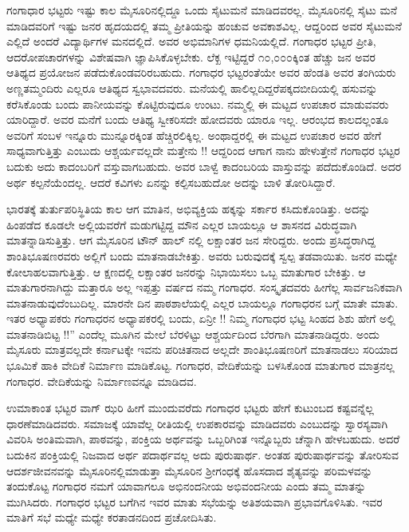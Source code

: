 {ಗಂಗಾಧಾರ ಭಟ್ಟರು ಇಷ್ಟು ಕಾಲ ಮೈಸೂರಿನಲ್ಲಿದ್ದೂ ಒಂದು ಸೈಟು\enginline{-}ಮನೆ ಮಾಡಿದವರಲ್ಲ. ಮೈಸೂರಿನಲ್ಲಿ ಸೈಟು ಮನೆ ಮಾಡಿದವರಿಗೆ ಇಷ್ಟು ಜನರ ಹೃದಯದಲ್ಲಿ ತಮ್ಮ ಪ್ರೀತಿಯನ್ನು ಹಂಚುವ ಅವಕಾಶವಿಲ್ಲ. ಆದ್ದರಿಂದ ಅವರ ಸೈಟು\enginline{-}ಮನೆ ಎಲ್ಲಿದೆ ಅಂದರೆ ವಿದ್ಯಾರ್ಥಿಗಳ ಮನದಲ್ಲಿದೆ. ಅವರ ಅಭಿಮಾನಿಗಳ ಧಮನಿಯಲ್ಲಿದೆ. ಗಂಗಾಧರ ಭಟ್ಟರ ಪ್ರೀತಿ, ಆದರೋಪಚಾರಗಳನ್ನು ವಿಶೇಷವಾಗಿ ಜ್ಞಾಪಿಸಿಕೊಳ್ಳಬೇಕು. ಲೆಕ್ಖ ಇಟ್ಟಿದ್ದರೆ ೧೦,೦೦೦ಕ್ಕಿಂತ ಹೆಚ್ಚು ಜನ ಅವರ ಆತಿಥ್ಯದ ಪ್ರಯೋಜನ ಪಡೆದುಕೊಂಡವರಿರಬಹುದು. ಗಂಗಾಧರ ಭಟ್ಟರಂತೆಯೇ ಅವರ ಹೆಂಡತಿ ಅವರ ತಂಗಿಯರು ಅಣ್ಣ\enginline{-}ತಮ್ಮಂದಿರು ಎಲ್ಲರೂ ಆತಿಥ್ಯದ ಸ್ವಭಾವದವರು. ಮನೆಯಲ್ಲಿ ಹಾಲಿಲ್ಲದಿದ್ದರೆ\break ಪಕ್ಕದಬೀದಿಯಲ್ಲಿ ಹಸುವನ್ನು ಕರೆಸಿಕೊಂಡು ಬಂದು ಪಾನೀಯವನ್ನು ಕೊಟ್ಟಿರು\-ವುದೂ ಉಂಟು. ನಮ್ಮಲ್ಲಿ ಈ ಮಟ್ಟದ ಉಪಚಾರ ಮಾಡುವವರು ಯಾರಿದ್ದಾರೆ. ಅವರ ಮನೆಗೆ ಬಂದು ಆತಿಥ್ಯ ಸ್ವೀಕರಿಸದೇ ಹೋದವರು ಯಾರೂ ಇಲ್ಲ. ಆರಂಭದ ಕಾಲದಲ್ಲಂತೂ ಅವರಿಗೆ ಸಂಬಳ ಇನ್ನೂರು ಮುನ್ನೂರಕ್ಕಿಂತ ಹೆಚ್ಚಿರಲಿಕ್ಕಿಲ್ಲ. ಅಂಥಾದ್ದರಲ್ಲಿ ಈ ಮಟ್ಟದ ಉಪಚಾರ ಅವರ ಹೇಗೆ ಸಾಧ್ಯವಾಗುತ್ತಿತ್ತು ಎಂಬುದು ಆಶ್ಚರ್ಯವಲ್ಲದೇ ಮತ್ತೇನು !! ಆದ್ದರಿಂದ ಆಗಾಗ ನಾನು ಹೇಳುತ್ತೇನೆ ಗಂಗಾಧರ ಭಟ್ಟರ ಬದುಕು ಅದು \hbox{ಕಾದಂಬರಿಗೆ} ವಸ್ತುವಾಗಬಹುದು. ಅವರ ಬಾಳ್ವೆ ಕಾದಂಬರಿಯ ವಾಸ್ತುವನ್ನು ಪದೆದುಕೊಂಡಿದೆ. ಅದರ ಅರ್ಥ ಕಲ್ಪನೆಯೆಂದಲ್ಲ. ಆದರೆ ಕವಿಗಳು ಏನನ್ನು ಕಲ್ಪಿಸಬಹುದೋ ಅದನ್ನು ಬಾಳಿ ತೋರಿಸಿದ್ದಾರೆ.

ಭಾರತಕ್ಕೆ ತುರ್ತುಪರಿಸ್ಥಿತಿಯ ಕಾಲ \enginline{-} ಆಗ ಮಾತಿನ, ಅಭಿವ್ಯಕ್ತಿಯ ಹಕ್ಕನ್ನು ಸರ್ಕಾರ ಕಸಿದುಕೊಂಡಿತ್ತು.  ಅದನ್ನು ಹಿಂಪಡೆದ ಕೂಡಲೇ ಅಲ್ಲಿಯವರೆಗೆ ಮಡುಗಟ್ಟಿದ್ದ ಮೌನ ಎಲ್ಲರ ಬಾಯಲ್ಲೂ ಆ ಶಾಸನದ ವಿರುದ್ಧವಾಗಿ ಮಾತನ್ನಾಡಿಸುತ್ತಿತ್ತು. ಆಗ ಮೈಸೂರಿನ ಟೌನ್ ಹಾಲ್ ನಲ್ಲಿ ಲಕ್ಷಾಂತರ ಜನ ಸೇರಿದ್ದರು. ಅಂದು ಪ್ರಸಿದ್ಧರಾಗಿದ್ದ ಶಾಂತಿ\break ಭೂಷಣರವರು ಅಲ್ಲಿಗೆ ಬಂದು ಮಾತನಾಡಬೇಕಿತ್ತು. ಅವರು ಬರುವುದಕ್ಕೆ ಸ್ವಲ್ಪ ತಡವಾಯಿತು. ಜನರ ಮಧ್ಯೇ ಕೋಲಾಹಲವಾಗುತ್ತಿತ್ತು. ಆ ಕ್ಷಣದಲ್ಲಿ ಲಕ್ಷಾಂತರ ಜನರನ್ನು ನಿಭಾಯಿಸಲು ಒಬ್ಬ ಮಾತುಗಾರ ಬೇಕಿತ್ತು. ಆ ಮಾತುಗಾರನಾಗಿದ್ದು ಮತ್ತಾರೂ ಅಲ್ಲ ಇಪ್ಪತ್ತು ವರ್ಷದ ನಮ್ಮ ಗಂಗಾಧರ. ಸಂಸ್ಕೃತದವರು ಹೀಗೆಲ್ಲ ಸಾರ್ವಜನಿಕ\-ವಾಗಿ ಮಾತನಾಡುವು\-ದೆಂಬುದಿಲ್ಲ. ಮಾರನೇ ದಿನ ಪಾಠಶಾಲೆಯಲ್ಲಿ ಎಲ್ಲರ ಬಾಯಲ್ಲೂ ಗಂಗಾಧರನ ಬಗ್ಗೆ ಮಾತೇ ಮಾತು. ಇತರ ಅಧ್ಯಾಪಕರು ಗಂಗಾಧರನ ಅಧ್ಯಾಪಕರಲ್ಲಿ ಬಂದು, ಏನ್ರೀ !! ನಿಮ್ಮ ಗಂಗಾಧರ ಭಟ್ಟ \enginline{-} ಸಿಂಹದ ಶಿಶು \enginline{-} ಹೇಗೆ ಅಲ್ಲಿ ಮಾತನಾಡಿ\-ಬಿಟ್ಟ !!” ಎಂದೆಲ್ಲ ಮೂಗಿನ ಮೇಲೆ ಬೆರಳಿಟ್ಟು ಆಶ್ಚರ್ಯದಿಂದ ಬೆರಗಾಗಿ ಮಾತನಾಡಿದ್ದರು. ಅಂದು ಮೈಸೂರು ಮಾತ್ರವಲ್ಲದೇ ಕರ್ನಾಟಕ್ಕೇ ಇವನು ಪರಿಚಿತನಾದ ಅಲ್ಲದೇ ಶಾಂತಿಭೂಷಣರಿಗೆ  ಮಾತನಾಡಲು ಸರಿಯಾದ ಭೂಮಿಕೆ ಹಾಕಿ ವೇದಿಕೆ ನಿರ್ಮಾಣ ಮಾಡಿಕೊಟ್ಟ. ಗಂಗಾಧರ, ವೇದಿಕೆಯನ್ನು ಬಳಸಿಕೊಂಡ ಮಾತುಗಾರ ಮಾತ್ರನಲ್ಲ ಗಂಗಾಧರ. ವೇದಿಕೆಯನ್ನು ನಿರ್ಮಾಣವನ್ನೂ ಮಾಡಿದವ. 

ಉಮಾಕಾಂತ ಭಟ್ಟರ ವಾಗ್ ಝರಿ  ಹೀಗೆ ಮುಂದುವರೆದು ಗಂಗಾಧರ ಭಟ್ಟರು ಹೇಗೆ ಕುಟುಂಬದ ಕಷ್ಟವನ್ನೆಲ್ಲ ಧಾರಣೆಮಾಡಿದವರು. ಸಮಾಜಕ್ಕೆ ಯಾವೆಲ್ಲ ರೀತಿಯಲ್ಲಿ ಉಪಕಾರವನ್ನು ಮಾಡಿದವರು ಎಂಬುದನ್ನು ಸ್ವಾರಸ್ಯವಾಗಿ ವಿವರಿಸಿ ಅಂತಿಮವಾಗಿ, \enginline{-} ಪಾಠವನ್ನು, ಪಂಕ್ತಿಯ ಅರ್ಥವನ್ನು ಒಬ್ಬರಿಗಿಂತ ಇನ್ನೊಬ್ಬರು  ಚೆನ್ನಾಗಿ ಹೇಳಬಹುದು. ಅದರೆ ಬದುಕಿನ ಪಂಕ್ತಿಯಲ್ಲಿ ನಿಜವಾದ ಅರ್ಥ ಪದಾರ್ಥವಲ್ಲ ಅದು ಪುರುಷಾರ್ಥ. ಅಂತಹ ಪುರುಷಾರ್ಥವನ್ನು ತೋರಿಸುವ ಆದರ್ಶಜೀವನವನ್ನು ಮೈಸೂರಿನಲ್ಲಿ\break ಮಾಡುತ್ತಾ ಮೈಸೂರಿನ ಶ್ರೀಗಂಧಕ್ಕೆ ಹೊಸದಾದ ಶೈತ್ಯವನ್ನು ಪರಿಮಳವನ್ನು ತಂದು\-ಕೊಟ್ಟ ಗಂಗಾಧರ ನಮಗೆ ಯಾವಾಗಲೂ ಅಭಿನಂದನೀಯ ಅಭಿವಂದನೀಯ ಎಂದು ತಮ್ಮ ಮಾತನ್ನು ಮುಗಿಸಿದರು. ಗಂಗಾಧರ ಭಟ್ಟರ ಬಗೆಗಿನ ಇವರ ಮಾತು ಸಭೆಯನ್ನು ಅತಿಶಯವಾಗಿ ಪ್ರಭಾವಗೊಳಿಸಿತು. ಇವರ ಮಾತಿಗೆ ಸಭೆ ಮಧ್ಯೇ ಮಧ್ಯೇ ಕರತಾಡನದಿಂದ ಪ್ರಚೋದಿಸಿತು.

}

